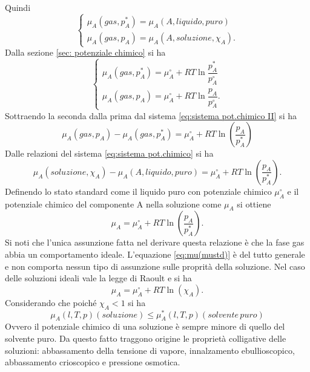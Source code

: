 \noindent
Quindi
\begin{equation}\label{eq:sistema pot.chimico}
    \begin{cases}
        \mu_A\left(gas,p_A^*\right)=\mu_A\left(A,liquido,puro\right) \\
        \mu_A\left(gas,p_A\right)=\mu_A\left(A,soluzione,\chi_A\right).
    \end{cases}
\end{equation}
Dalla sezione \ref{sec: potenziale chimico} si ha
\begin{equation}\label{eq:sistema pot.chimico II}
    \begin{cases}
        \mu_A\left(gas,p_A^*\right)=\mu_A^\circ+RT\ln{\dfrac{p_A^*}{p_A^\circ}} \\[2ex]
        \mu_A\left(gas,p_A\right)=\mu_A^\circ+RT\ln{\dfrac{p_A}{p_A^\circ}}.
    \end{cases}
\end{equation}
Sottraendo la seconda dalla prima dal sistema \eqref{eq:sistema pot.chimico II} si ha
\begin{equation}
    \mu_A\left(gas,p_A\right)-\mu_A\left(gas,p_A^*\right)=\mu_A^\circ+RT\ln{\left(\frac{p_A}{p_A^*}\right)}
\end{equation}
Dalle relazioni del sistema \eqref{eq:sistema pot.chimico} si ha
\begin{equation}
     \mu_A\left(soluzione,\chi_A\right)-\mu_A\left(A,liquido,puro\right)=\mu_A^\circ+RT\ln{\left(\frac{p_A}{p_A^*}\right)}.
\end{equation}
Definendo lo stato standard come il liquido puro con potenziale chimico $\mu_A^\circ$ e il potenziale chimico del componente A nella soluzione come $\mu_A$ si ottiene
\begin{equation}\label{eq:mu(mustd)}
    \mu_A=\mu_A^\circ+RT\ln{\left(\frac{p_A}{p_A^*}\right)}.
\end{equation}
Si noti che l'unica assunzione fatta nel derivare questa relazione è che la fase gas abbia un comportamento ideale. L'equazione \eqref{eq:mu(mustd)} è del tutto generale e non comporta nessun tipo di assunzione sulle proprità della soluzione. Nel caso delle soluzioni ideali vale la legge di Raoult e si ha
\begin{equation}\label{eq:mu(mustd)Raoult}
    \mu_A=\mu_A^\circ+RT\ln{\left(\chi_A\right)}.
\end{equation}
Considerando che poiché $\chi_A<1$ si ha
\begin{equation}
    \mu_A\left(l,T,p\right)\left(soluzione\right)\leq\mu_A^*\left(l,T,p\right)\left(solvente\,puro\right)
\end{equation}
Ovvero il potenziale chimico di una soluzione è sempre minore di quello del solvente puro. Da questo fatto traggono origine le proprietà colligative delle soluzioni: abbassamento della tensione di vapore, innalzamento ebullioscopico, abbassamento crioscopico e pressione osmotica. 

